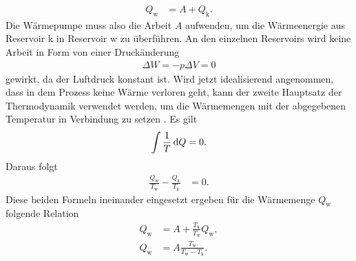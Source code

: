 \begin{align}
    Q_\text{w}    &= A +  Q_\text{k}. %
\end{align}
%
Die Wärmepumpe muss also die Arbeit $A$ aufwenden, um die Wärmeenergie aus Reservoir k in Reservoir w zu überführen.
An den einzelnen Reservoirs wird keine Arbeit in Form von einer Druckänderung 
\begin{align*}
    \Delta W = - p \Delta V = 0 
\end{align*}
gewirkt, da der Luftdruck konstant ist.
Wird jetzt idealisierend angenommen, dass in dem Prozess keine Wärme verloren geht, kann der zweite Hauptsatz der Thermodynamik
verwendet werden, um die Wärmemengen mit der abgegebenen Temperatur in Verbindung zu setzen \cite[vgl.][1]{man:v206}. 
Es gilt
\begin{align*}
    \int \frac{1}{T} \diff Q = 0. %
\end{align*}
Daraus folgt
\begin{align}
    \frac{Q_\text{w}}{T_\text{w}} - \frac{Q_\text{k}}{T_\text{k}} &= 0.%
\end{align}
Diese beiden Formeln ineinander eingesetzt ergeben für die Wärmemenge $Q_\text{w}$ folgende Relation \cite{man:v206}
\begin{align}
\nonumber    Q_\text{w} &= A + \frac{T_\text{k}}{T_\text{w}}Q_\text{w}, \\
    Q_\text{w} &= A \frac{T_\text{w}}{T_\text{w} - T_\text{k}}.
\end{align}
